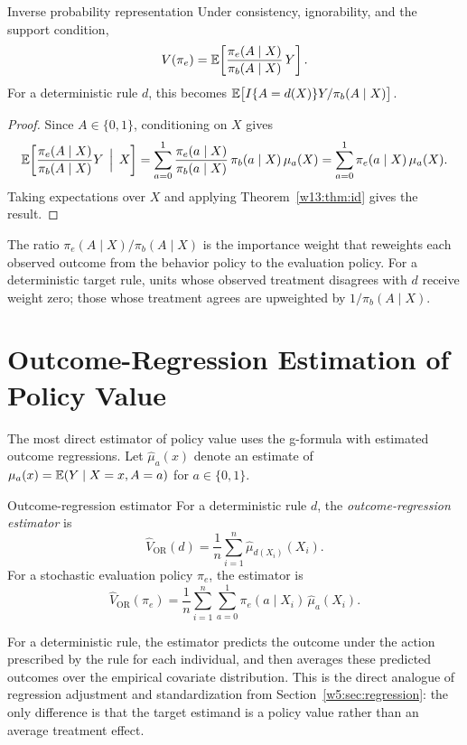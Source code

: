\documentclass[master.tex]{subfiles}
\begin{document}
\begin{thm}{Inverse probability representation}
\label{w13:thm:ipw-rep}
Under consistency, ignorability, and the support condition,
\[
V(\pi_e)
=
\mathbb{E}\!\left[\frac{\pi_e(A\mid X)}{\pi_b(A\mid X)}\,Y\right].
\]
For a deterministic rule $d$, this becomes
$\mathbb{E}\bigl[I\{A=d(X)\}Y/\pi_b(A\mid X)\bigr]$.
\end{thm}

\begin{proof}
Since $A\in\{0,1\}$, conditioning on $X$ gives
\[
\mathbb{E}\!\left[\frac{\pi_e(A\mid X)}{\pi_b(A\mid X)}Y\,\Bigm|\,X\right]
=
\sum_{a=0}^1
\frac{\pi_e(a\mid X)}{\pi_b(a\mid X)}\,\pi_b(a\mid X)\,\mu_a(X)
=
\sum_{a=0}^1\pi_e(a\mid X)\,\mu_a(X).
\]
Taking expectations over $X$ and applying Theorem~\ref{w13:thm:id} gives the result.
\end{proof}

The ratio $\pi_e(A\mid X)/\pi_b(A\mid X)$ is the importance weight that reweights each observed outcome from the behavior policy to the evaluation policy.  For a deterministic target rule, units whose observed treatment disagrees with $d$ receive weight zero; those whose treatment agrees are upweighted by $1/\pi_b(A\mid X)$.

\section{Outcome-Regression Estimation of Policy Value}
\label{w13:sec:or}

The most direct estimator of policy value uses the g-formula with estimated outcome regressions.  Let $\hat\mu_a(x)$ denote an estimate of $\mu_a(x)=\mathbb{E}(Y\mid X=x,A=a)$ for $a\in\{0,1\}$.

\begin{defn}{Outcome-regression estimator}
\label{w13:defn:or-est}
For a deterministic rule $d$, the \emph{outcome-regression estimator} is
\[
\hat V_{\mathrm{OR}}(d)
=
\frac{1}{n}\sum_{i=1}^n
\hat\mu_{d(X_i)}(X_i).
\]
For a stochastic evaluation policy $\pi_e$, the estimator is
\[
\hat V_{\mathrm{OR}}(\pi_e)
=
\frac{1}{n}\sum_{i=1}^n
\sum_{a=0}^1
\pi_e(a\mid X_i)\,\hat\mu_a(X_i).
\]
\end{defn}

For a deterministic rule, the estimator predicts the outcome under the action prescribed by the rule for each individual, and then averages these predicted outcomes over the empirical covariate distribution.  This is the direct analogue of regression adjustment and standardization from Section~\ref{w5:sec:regression}: the only difference is that the target estimand is a policy value rather than an average treatment effect.
\end{document}
